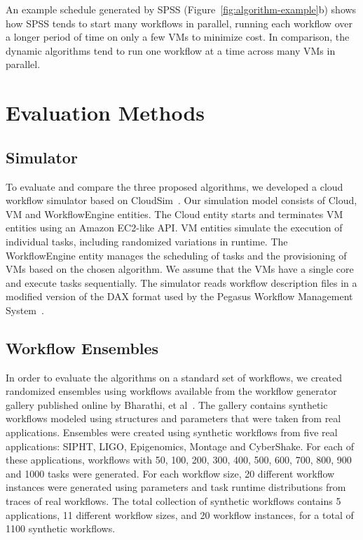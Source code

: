 \documentclass[conference]{IEEEtran}
\begin{document}
An example schedule generated by SPSS (Figure~\ref{fig:algorithm-example}b)
shows how SPSS tends to start many workflows in parallel, running each workflow
over a longer period of time on only a few VMs to minimize cost. In comparison,
the dynamic algorithms tend to run one workflow at a time across many VMs in
parallel.


\section{Evaluation Methods}
\label{sec:performance}


\subsection{Simulator}

To evaluate and compare the three proposed algorithms, we developed a cloud
workflow simulator based on CloudSim~\cite{Calheiros2011}. Our simulation model
consists of Cloud, VM and WorkflowEngine entities. The Cloud entity starts and
terminates VM entities using an Amazon EC2-like API. VM entities simulate the
execution of individual tasks, including randomized variations in runtime. The
WorkflowEngine entity manages the scheduling of tasks and the provisioning of 
VMs based on the chosen algorithm. We assume that the VMs have a single core
and execute tasks sequentially. 
The simulator reads workflow description files in
a modified version of the DAX format used by the Pegasus Workflow Management
System~\cite{Deelman2005}. 


\subsection{Workflow Ensembles}
\label{sec:ensembles}


In order to evaluate the algorithms on a standard set of workflows, we created
randomized ensembles using workflows available from the workflow generator
gallery published online by Bharathi, et al~\cite{WorkflowGenerator}. The
gallery contains synthetic workflows modeled using structures and parameters
that were taken from real applications. Ensembles were created using synthetic
workflows from five real applications: SIPHT, LIGO, Epigenomics, Montage and
CyberShake. For each of these applications, workflows with 50, 100, 200, 300,
400, 500, 600, 700, 800, 900 and 1000 tasks were generated. For each workflow
size, 20 different workflow instances were generated using parameters and task
runtime distributions from traces of real workflows. The total collection of
synthetic workflows contains 5 applications, 11 different workflow sizes, and 20
workflow instances, for a total of 1100 synthetic workflows.
\end{document}
